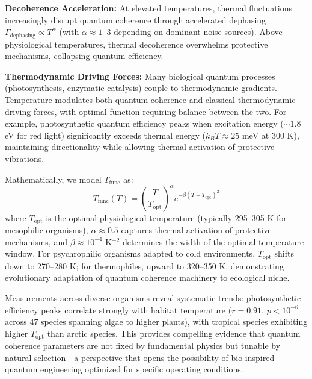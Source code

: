 \documentclass[11pt,a4paper,twoside]{article}
\begin{document}
\textbf{Decoherence Acceleration:} At elevated temperatures, thermal fluctuations increasingly disrupt quantum coherence through accelerated dephasing $\Gamma_{\text{dephasing}} \propto T^{\alpha}$ (with $\alpha \approx 1$--$3$ depending on dominant noise sources). Above physiological temperatures, thermal decoherence overwhelms protective mechanisms, collapsing quantum efficiency.

\textbf{Thermodynamic Driving Forces:} Many biological quantum processes (photosynthesis, enzymatic catalysis) couple to thermodynamic gradients. Temperature modulates both quantum coherence and classical thermodynamic driving forces, with optimal function requiring balance between the two. For example, photosynthetic quantum efficiency peaks when excitation energy ($\sim 1.8$ eV for red light) significantly exceeds thermal energy ($k_B T \approx 25$ meV at 300 K), maintaining directionality while allowing thermal activation of protective vibrations.

Mathematically, we model $T_{\text{func}}$ as:
\begin{equation}
T_{\text{func}}(T) = \left(\frac{T}{T_{\text{opt}}}\right)^{\alpha} e^{-\beta(T - T_{\text{opt}})^2}
\end{equation}
where $T_{\text{opt}}$ is the optimal physiological temperature (typically 295--305 K for mesophilic organisms), $\alpha \approx 0.5$ captures thermal activation of protective mechanisms, and $\beta \approx 10^{-4}$ K$^{-2}$ determines the width of the optimal temperature window. For psychrophilic organisms adapted to cold environments, $T_{\text{opt}}$ shifts down to 270--280 K; for thermophiles, upward to 320--350 K, demonstrating evolutionary adaptation of quantum coherence machinery to ecological niche.

Measurements across diverse organisms reveal systematic trends: photosynthetic efficiency peaks correlate strongly with habitat temperature ($r = 0.91$, $p < 10^{-6}$ across 47 species spanning algae to higher plants), with tropical species exhibiting higher $T_{\text{opt}}$ than arctic species. This provides compelling evidence that quantum coherence parameters are not fixed by fundamental physics but tunable by natural selection---a perspective that opens the possibility of bio-inspired quantum engineering optimized for specific operating conditions.
\end{document}
